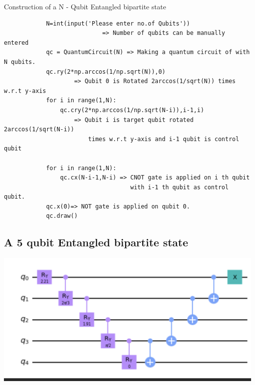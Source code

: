 \documentclass[a4paper]{article}
\begin{document}
    \begin{answer}[Question 5 b]
        Construction of a N - Qubit Entangled bipartite state 
        \begin{verbatim}
            N=int(input('Please enter no.of Qubits'))
                            => Number of qubits can be manually entered 
            qc = QuantumCircuit(N) => Making a quantum circuit of with N qubits.
            qc.ry(2*np.arccos(1/np.sqrt(N)),0) 
                    => Qubit 0 is Rotated 2arccos(1/sqrt(N)) times w.r.t y-axis 
            for i in range(1,N):
                qc.cry(2*np.arccos(1/np.sqrt(N-i)),i-1,i)
                    => Qubit i is target qubit rotated 2arccos(1/sqrt(N-i)) 
                        times w.r.t y-axis and i-1 qubit is control qubit 

            for i in range(1,N):
                qc.cx(N-i-1,N-i) => CNOT gate is applied on i th qubit 
                                    with i-1 th qubit as control qubit. 
            qc.x(0)=> NOT gate is applied on qubit 0. 
            qc.draw()
        \end{verbatim}
        \subsection*{A 5 qubit Entangled bipartite state}
        \includegraphics[scale = 0.6]{5-b.png}
    \end{answer}
\end{document}
